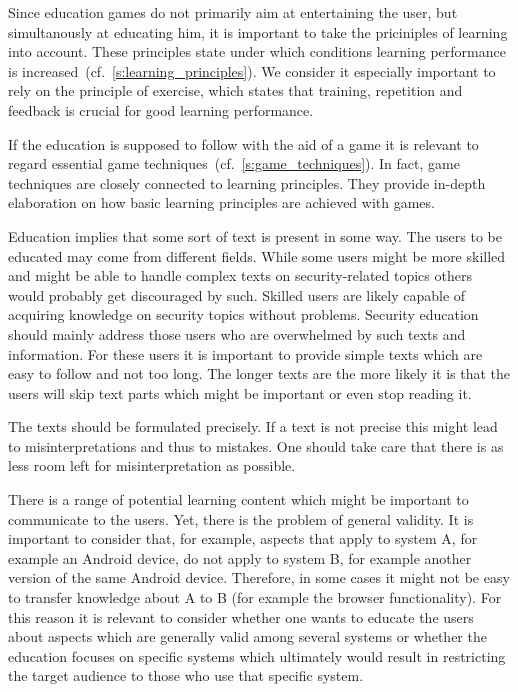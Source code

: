 \begin{description}[leftmargin=0cm]
	\item[Principles of Learning:] Since education games do not primarily aim at entertaining the user, but simultanously at educating him, it is important to take the priciniples of learning into account.
These principles state under which conditions learning performance is increased~(cf.~\autoref{s:learning_principles}).
We consider it especially important to rely on the principle of exercise, which states that training, repetition and feedback is crucial for good learning performance.
	\item[Game Techniques:]  If the education is supposed to follow with the aid of a game it is relevant to regard essential game techniques~(cf.~\autoref{s:game_techniques}).
In fact, game techniques are closely connected to learning principles.
They provide in-depth elaboration on how basic learning principles are achieved with games.
	\item[Simple and Short Text:] Education implies that some sort of text is present in some way.
The users to be educated may come from different fields.
While some users might be more skilled and might be able to handle complex texts on security-related topics others would probably get discouraged by such.
Skilled users are likely capable of acquiring knowledge on security topics without problems.
Security education should mainly address those users who are overwhelmed by such texts and information.
For these users it is important to provide simple texts which are easy to follow and not too long.
The longer texts are the more likely it is that the users will skip text parts which might be important or even stop reading it.
\item[Precise Phrasing:] The texts should be formulated precisely. 
If a text is not precise this might lead to misinterpretations and thus to mistakes. 
One should take care that there is as less room left for misinterpretation as possible.
\item[General Validity:] There is a range of potential learning content which might be important to communicate to the users.
Yet, there is the problem of general validity.
It is important to consider that, for example, aspects that apply to system A, for example an Android device, do not apply to system B, for example another version of the same Android device.
Therefore, in some cases it might not be easy to transfer knowledge about A to B (for example the browser functionality).
For this reason it is relevant to consider whether one wants to educate the users about aspects which are generally valid among several systems or whether the education focuses on specific systems which ultimately would result in restricting the target audience to those who use that specific system.
\end{description}


